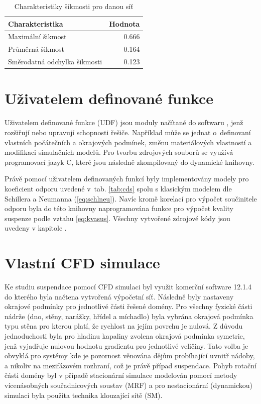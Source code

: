 \begin{table}[h!]
\centering
\caption{Charakteristiky šikmosti pro danou síť}
\label{tab:skw_tab}
\begin{tabular}{lr}
\toprule
\textbf{Charakteristika} & \textbf{Hodnota} \\
\midrule

Maximální šikmost & \num{0.666} \\
Průměrná šikmost & \num{0.164} \\
Směrodatná odchylka šikmosti & \num{0.123} \\

\bottomrule
\end{tabular}
\end{table}

\section{Uživatelem definované funkce}
Uživatelem definované funkce (UDF) jsou moduly načítané do softwaru \flu, jenž rozšiřují nebo upravují schopnosti řešiče. Například může se jednat o~definovaní vlastních počátečních a okrajových podmínek, změnu materiálových vlastností a modifikaci simulačních modelů. Pro tvorbu zdrojových souborů se využívá programovací jazyk C, které jsou následně zkompilovaný do dynamické knihovny.

Právě pomocí uživatelem definovaných funkcí byly implementovány modely pro koeficient odporu uvedené v~tab. \ref{tab:cds} spolu s klasickým modelem dle Schillera a Neumanna (\ref{eq:schlneu}). Navíc kromě korelací pro výpočet součinitele odporu byla do této knihovny naprogramována funkce pro výpočet kvality suspenze podle vztahu \ref{eq:kvasus}. Všechny vytvořené zdrojové kódy jsou uvedeny v kapitole .

\section{Vlastní CFD simulace}
Ke studiu suspendace pomocí CFD simulaci byl využit komerční software \flu{} 12.1.4 do kterého byla načtena vytvořená výpočetní síť. Následně byly nastaveny okrajové podmínky pro jednotlivé části řešené domény. Pro všechny fyzické části nádrže (dno, stěny, narážky, hřídel a míchadlo) byla vybrána okrajová podmínka typu stěna pro kterou platí, že rychlost na jejím povrchu je nulová. Z důvodu jednoduchosti byla pro hladinu kapaliny zvolena okrajová podmínka symetrie, jenž vyjadřuje nulovou hodnotu gradientu pro jednotlivé veličiny. Tato volba je obvyklá pro systémy kde je pozornost věnována dějům probíhající uvnitř nádoby, a nikoliv na mezifázovém rozhraní, což je právě případ suspendace. Pohyb rotační části domény byl v případě stacionární simulace modelován pomocí metody vícenásobných souřadnicových soustav (MRF) a pro nestacionární (dynamickou) simulaci byla použita technika klouzající sítě (SM). 

